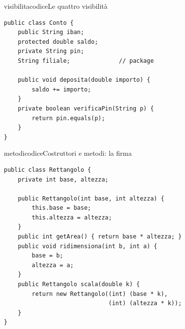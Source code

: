 \begin{caso}{visibilitacodice}{Le quattro visibilità}
\begin{lstlisting}[style=javacs]
public class Conto {
    public String iban;
    protected double saldo;
    private String pin;
    String filiale;              // package

    public void deposita(double importo) {
        saldo += importo;
    }
    private boolean verificaPin(String p) {
        return pin.equals(p);
    }
}
\end{lstlisting}
\tcblower
{}
\end{caso}

\begin{caso}{metodicodice}{Costruttori e metodi: la firma}
\begin{lstlisting}[style=javacs]
public class Rettangolo {
    private int base, altezza;

    public Rettangolo(int base, int altezza) {
        this.base = base;
        this.altezza = altezza;
    }
    public int getArea() { return base * altezza; }
    public void ridimensiona(int b, int a) {
        base = b;
        altezza = a;
    }
    public Rettangolo scala(double k) {
        return new Rettangolo((int) (base * k),
                              (int) (altezza * k));
    }
}
\end{lstlisting}
\tcblower
{}
\end{caso}

